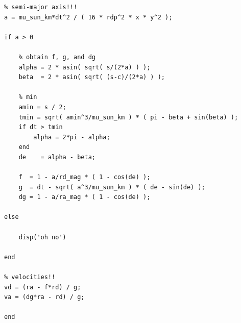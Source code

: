 \documentclass[conf]{new-aiaa}
\begin{document}
\begin{lstlisting}
% semi-major axis!!! 
a = mu_sun_km*dt^2 / ( 16 * rdp^2 * x * y^2 ); 

if a > 0 
    
    % obtain f, g, and dg 
    alpha = 2 * asin( sqrt( s/(2*a) ) ); 
    beta  = 2 * asin( sqrt( (s-c)/(2*a) ) ); 
    
    % min 
    amin = s / 2; 
    tmin = sqrt( amin^3/mu_sun_km ) * ( pi - beta + sin(beta) ); 
    if dt > tmin 
        alpha = 2*pi - alpha; 
    end 
    de    = alpha - beta; 
    
    f  = 1 - a/rd_mag * ( 1 - cos(de) ); 
    g  = dt - sqrt( a^3/mu_sun_km ) * ( de - sin(de) ); 
    dg = 1 - a/ra_mag * ( 1 - cos(de) ); 

else
    
    disp('oh no') 
    
end 

% velocities!! 
vd = (ra - f*rd) / g; 
va = (dg*ra - rd) / g; 

end 
	
	
	
	
\end{lstlisting}






% 
\end{document}
